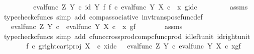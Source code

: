 \begin{isabellebody}
\ \ \ \ \isamarkupfalse%
\ \isamarkupfalse%
\ {\isachardoublequoteopen}{\isachardot}{\kern0pt}{\isachardot}{\kern0pt}{\isachardot}{\kern0pt}\ {\isacharequal}{\kern0pt}\ {\isacharparenleft}{\kern0pt}eval{\isacharunderscore}{\kern0pt}func\ Z\ Y{\isacharparenright}{\kern0pt}\ {\isasymcirc}\isactrlsub c\ {\isacharparenleft}{\kern0pt}id\ Y\ {\isasymtimes}\isactrlsub f\ f{\isacharparenright}{\kern0pt}\ {\isasymcirc}\isactrlsub c\ {\isasymlangle}{\isacharparenleft}{\kern0pt}eval{\isacharunderscore}{\kern0pt}func\ Y\ X{\isacharparenright}{\kern0pt}\ {\isasymcirc}\isactrlsub c\ \ {\isasymlangle}x{\isacharcomma}{\kern0pt}\ g{\isasymrangle}{\isacharcomma}{\kern0pt}id\isactrlsub c\ {\isasymone}{\isasymrangle}{\isachardoublequoteclose}\isanewline
\ \ \ \ \ \ \isamarkupfalse%
\ assms\ \isamarkupfalse%
\ {\isacharparenleft}{\kern0pt}typecheck{\isacharunderscore}{\kern0pt}cfuncs{\isacharcomma}{\kern0pt}\ simp\ add{\isacharcolon}{\kern0pt}\ comp{\isacharunderscore}{\kern0pt}associative{}\ inv{\isacharunderscore}{\kern0pt}transpose{\isacharunderscore}{\kern0pt}func{\isacharunderscore}{\kern0pt}def{}{\isacharparenright}{\kern0pt}\isanewline
\ \ \ \ \isamarkupfalse%
\ \isamarkupfalse%
\ {\isachardoublequoteopen}{\isachardot}{\kern0pt}{\isachardot}{\kern0pt}{\isachardot}{\kern0pt}\ {\isacharequal}{\kern0pt}\ {\isacharparenleft}{\kern0pt}eval{\isacharunderscore}{\kern0pt}func\ Z\ Y{\isacharparenright}{\kern0pt}\ {\isasymcirc}\isactrlsub c\ \ {\isasymlangle}{\isacharparenleft}{\kern0pt}eval{\isacharunderscore}{\kern0pt}func\ Y\ X{\isacharparenright}{\kern0pt}\ {\isasymcirc}\isactrlsub c\ \ {\isasymlangle}x{\isacharcomma}{\kern0pt}\ g{\isasymrangle}{\isacharcomma}{\kern0pt}f{\isasymrangle}{\isachardoublequoteclose}\isanewline
\ \ \ \ \ \ \isamarkupfalse%
\ assms\ \isamarkupfalse%
\ {\isacharparenleft}{\kern0pt}typecheck{\isacharunderscore}{\kern0pt}cfuncs{\isacharcomma}{\kern0pt}\ simp\ add{\isacharcolon}{\kern0pt}\ cfunc{\isacharunderscore}{\kern0pt}cross{\isacharunderscore}{\kern0pt}prod{\isacharunderscore}{\kern0pt}comp{\isacharunderscore}{\kern0pt}cfunc{\isacharunderscore}{\kern0pt}prod\ id{\isacharunderscore}{\kern0pt}left{\isacharunderscore}{\kern0pt}unit{}\ id{\isacharunderscore}{\kern0pt}right{\isacharunderscore}{\kern0pt}unit{}{\isacharparenright}{\kern0pt}\isanewline
\ \ \ \ \isamarkupfalse%
\ \isamarkupfalse%
\ {\isachardoublequoteopen}{\isacharparenleft}{\kern0pt}f\isactrlsup {\isasymflat}\ {\isasymcirc}\isactrlsub c\ {\isasymlangle}g\isactrlsup {\isasymflat}{\isacharcomma}{\kern0pt}right{\isacharunderscore}{\kern0pt}cart{\isacharunderscore}{\kern0pt}proj\ X\ {\isasymone}{\isasymrangle}{\isacharparenright}{\kern0pt}\ {\isasymcirc}\isactrlsub c\ {\isasymlangle}x{\isacharcomma}{\kern0pt}id\isactrlsub c\ {\isasymone}{\isasymrangle}\ {\isacharequal}{\kern0pt}\ eval{\isacharunderscore}{\kern0pt}func\ Z\ Y\ {\isasymcirc}\isactrlsub c\ {\isasymlangle}eval{\isacharunderscore}{\kern0pt}func\ Y\ X\ {\isasymcirc}\isactrlsub c\ {\isasymlangle}x{\isacharcomma}{\kern0pt}g{\isasymrangle}{\isacharcomma}{\kern0pt}f{\isasymrangle}{\isachardoublequoteclose}\isanewline

\end{isabellebody}
